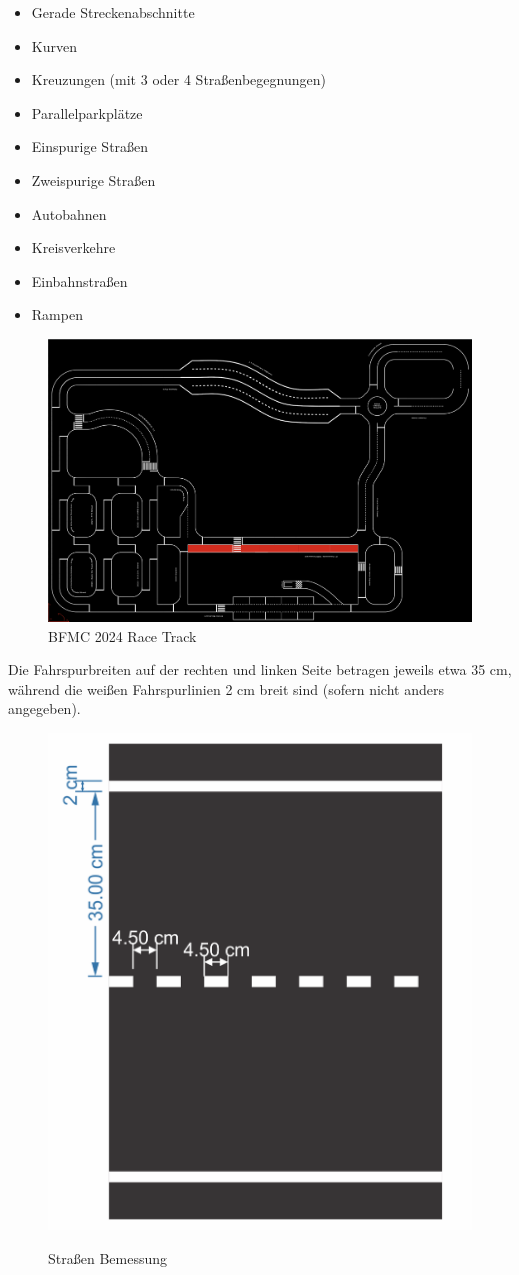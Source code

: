 \begin{itemize}
    \item Gerade Streckenabschnitte
    \item Kurven
    \item Kreuzungen (mit 3 oder 4 Straßenbegegnungen)
    \item Parallelparkplätze
    \item Einspurige Straßen
    \item Zweispurige Straßen
    \item Autobahnen
    \item Kreisverkehre
    \item Einbahnstraßen
    \item Rampen
\end{itemize}

\begin{figure}[!h]
    \centering
    \includegraphics[width=1\linewidth]{Pictures/RaceTrack.png}
    \caption{\gls{BFMC} 2024 Race Track}
    \label{fig:race-track}
\end{figure}

\newpage

Die Fahrspurbreiten auf der rechten und linken Seite betragen jeweils etwa 35 cm, während die weißen Fahrspurlinien 2 cm breit sind (sofern nicht anders angegeben).\cite{bfmc-roadMark}

\begin{figure}[!h]
    \centering
    \includegraphics[width=0.5\linewidth]{Pictures/road.png}
    \caption{Straßen Bemessung}
    \cite{bfmc-roadMark}
\end{figure}

